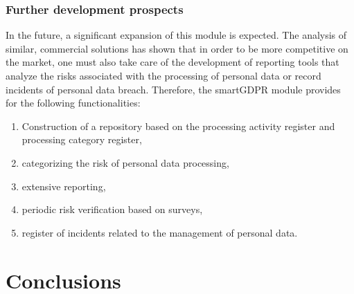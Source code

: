 \documentclass[en, noamssymb]{mgr}
\begin{document}
\subsection{Further development prospects}

In the future, a significant expansion of this module is expected. The analysis of similar, commercial solutions has shown that in order to be more competitive on the market, one must also take care of the development of reporting tools that analyze the risks associated with the processing of personal data or record incidents of personal data breach. Therefore, the smartGDPR module provides for the following functionalities:

\begin{enumerate}

\item Construction of a repository based on the processing activity register and processing category register,

\item categorizing the risk of personal data processing,

\item extensive reporting,

\item periodic risk verification based on surveys,

\item register of incidents related to the management of personal data.

\end{enumerate}

\chapter{Conclusions} \label{sec:sekcjaWnioski}
\end{document}

